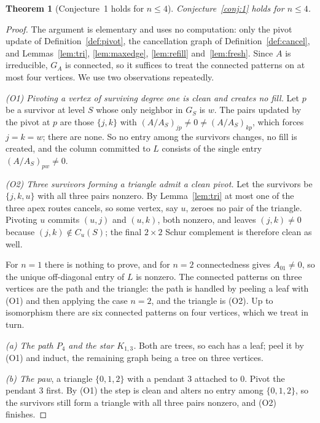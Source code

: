 \documentclass[11pt]{article}
\theoremstyle{plain}
\newtheorem{theorem}{Theorem}[section]
\theoremstyle{definition}
\theoremstyle{remark}
\begin{document}
\begin{humanblock}
\begin{theorem}[Conjecture~1 holds for $n\le4$]\label{thm:leq4}
Conjecture~\ref{conj:1} holds for $n\le4$.
\end{theorem}
\begin{proof}
The argument is elementary and uses no computation: only the pivot update of
Definition~\ref{def:pivot}, the cancellation graph of Definition~\ref{def:cancel}, and
Lemmas~\ref{lem:tri}, \ref{lem:maxedge}, \ref{lem:refill} and~\ref{lem:fresh}. Since $A$ is
irreducible, $G_A$ is connected, so it suffices to treat the connected patterns on at most four
vertices. We use two observations repeatedly.

\emph{(O1) Pivoting a vertex of surviving degree one is clean and creates no fill.} Let $p$ be a
survivor at level $S$ whose only neighbor in $G_S$ is $w$. The pairs updated by the pivot at $p$ are
those $\{j,k\}$ with $(A/A_S)_{jp}\neq0\neq(A/A_S)_{kp}$, which forces $j=k=w$; there are none. So no
entry among the survivors changes, no fill is created, and the column committed to $L$ consists of the
single entry $(A/A_S)_{pw}\neq0$.

\emph{(O2) Three survivors forming a triangle admit a clean pivot.} Let the survivors be $\{j,k,u\}$
with all three pairs nonzero. By Lemma~\ref{lem:tri} at most one of the three apex routes cancels, so
some vertex, say $u$, zeroes no pair of the triangle. Pivoting $u$ commits $(u,j)$ and $(u,k)$, both
nonzero, and leaves $(j,k)\neq0$ because $(j,k)\notin C_u(S)$; the final $2\times2$ Schur complement
is therefore clean as well.

For $n=1$ there is nothing to prove, and for $n=2$ connectedness gives $A_{01}\neq0$, so the unique
off-diagonal entry of $L$ is nonzero. The connected patterns on three vertices are the path and the
triangle: the path is handled by peeling a leaf with (O1) and then applying the case $n=2$, and the
triangle is (O2). Up to isomorphism there are six connected patterns on four vertices, which we treat
in turn.

\emph{(a) The path $P_4$ and the star $K_{1,3}$.} Both are trees, so each has a leaf; peel it by (O1)
and induct, the remaining graph being a tree on three vertices.

\emph{(b) The paw}, a triangle $\{0,1,2\}$ with a pendant $3$ attached to $0$. Pivot the pendant $3$
first. By (O1) the step is clean and alters no entry among $\{0,1,2\}$, so the survivors still form a
triangle with all three pairs nonzero, and (O2) finishes.


\end{proof}
\end{humanblock}
\end{document}
